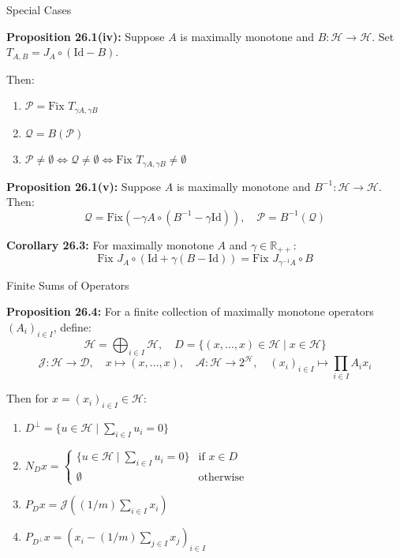 \documentclass[aspectratio=169,10pt]{beamer}
\begin{document}
\begin{frame}{Special Cases}

\textbf{Proposition 26.1(iv):} Suppose $A$ is maximally monotone and $B: \mathcal{H} \to \mathcal{H}$.
Set $T_{A,B} = J_A \circ (\text{Id} - B)$.

Then:
\begin{enumerate}
  \item[(a)] $\mathcal{P} = \text{Fix } T_{\gamma A,\gamma B}$

  \item[(b)] $\mathcal{Q} = B(\mathcal{P})$

  \item[(c)] $\mathcal{P} \neq \emptyset \Leftrightarrow \mathcal{Q} \neq \emptyset \Leftrightarrow \text{Fix } T_{\gamma A,\gamma B} \neq \emptyset$
\end{enumerate}

\vspace{0.3cm}
\textbf{Proposition 26.1(v):} Suppose $A$ is maximally monotone and $B^{-1}: \mathcal{H} \to \mathcal{H}$.
Then:
\[ \mathcal{Q} = \text{Fix}(-\gamma A \circ (B^{-1} - \gamma \text{Id})), \quad \mathcal{P} = B^{-1}(\mathcal{Q}) \]

\vspace{0.3cm}
\textbf{Corollary 26.3:} For maximally monotone $A$ and $\gamma \in \mathbb{R}_{++}$:
\[ \text{Fix } J_A \circ (\text{Id} + \gamma(B - \text{Id})) = \text{Fix } J_{\gamma^{-1}A} \circ B \]

\end{frame}

\begin{frame}{Finite Sums of Operators}

\textbf{Proposition 26.4:} For a finite collection of maximally monotone operators $(A_i)_{i \in I}$, define:
\[ \mathcal{H} = \bigoplus_{i \in I} \mathcal{H}, \quad D = \{(x, \ldots, x) \in \mathcal{H} \mid x \in \mathcal{H}\} \]
\[ \mathcal{J}: \mathcal{H} \to \mathcal{D}, \quad x \mapsto (x, \ldots, x), \quad
   \mathcal{A}: \mathcal{H} \to 2^{\mathcal{H}}, \quad (x_i)_{i \in I} \mapsto \prod_{i \in I} A_i x_i \]

Then for $x = (x_i)_{i \in I} \in \mathcal{H}$:
\begin{enumerate}
  \item[(i)] $D^{\perp} = \{u \in \mathcal{H} \mid \sum_{i \in I} u_i = 0\}$

  \item[(ii)] $N_D x = \begin{cases} \{u \in \mathcal{H} \mid \sum_{i \in I} u_i = 0\} & \text{if } x \in D \\ \emptyset & \text{otherwise} \end{cases}$

  \item[(iii)] $P_D x = \mathcal{J}((1/m)\sum_{i \in I} x_i)$

  \item[(iv)] $P_{D^{\perp}} x = (x_i - (1/m)\sum_{j \in I} x_j)_{i \in I}$
\end{enumerate}

\end{frame}
\end{document}
